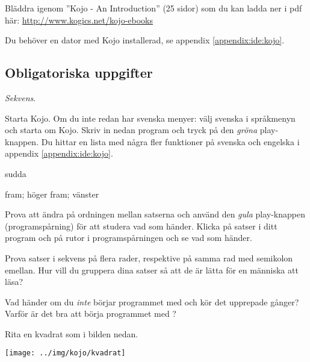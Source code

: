 
\Lab{\LabWeekONE}

\begin{Goals}

\end{Goals}

\begin{Preparations}
\item {}%
\item Bläddra igenom ''Kojo - An Introduction'' (25 sidor) som du kan ladda ner i pdf  här: \href{http://www.kogics.net/kojo-ebooks}{http://www.kogics.net/kojo-ebooks}
\item Du behöver en dator med Kojo installerad, se appendix \ref{appendix:ide:kojo}.
\end{Preparations}

\subsection{Obligatoriska uppgifter}


\Task \textit{Sekvens}.

\Subtask Starta Kojo. Om du inte redan har svenska menyer: välj svenska i språkmenyn och starta om Kojo.  Skriv in nedan program och tryck på den \emph{gröna} play-knappen. Du hittar en lista med några fler funktioner på svenska och engelska i appendix \ref{appendix:ide:kojo}.

\begin{Code}
sudda

fram; höger
fram; vänster
\end{Code}


\Subtask Prova att ändra på ordningen mellan satserna och använd den \emph{gula} play-knappen  (programspårning) för att studera vad som händer. Klicka på satser i ditt program och på rutor i programspårningen och se vad som händer.

\Subtask Prova satser i sekvens på flera rader, respektive på samma rad med semikolon emellan. Hur vill du gruppera dina satser så att de är lätta för en människa att läsa?

\Subtask\Pen Vad händer om du \emph{inte} börjar programmet med  och kör det upprepade gånger? Varför är det bra att börja programmet med ?

\Subtask Rita en kvadrat som i bilden nedan.

\texttt{[image: ../img/kojo/kvadrat]}


